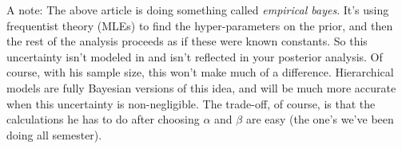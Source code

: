 \documentclass{article}
\begin{document}
A note:  The above article is doing something called {\it empirical bayes}.  It's using frequentist theory (MLEs) to find the hyper-parameters on the prior, and then the rest of the analysis proceeds as if these were known constants.  So this uncertainty isn't modeled in and isn't reflected in your posterior analysis.  Of course, with his sample size, this won't make much of a difference.  Hierarchical models are fully Bayesian versions of this idea, and will be much more accurate when this uncertainty is non-negligible.  The trade-off, of course, is that the calculations he has to do after choosing $\alpha$ and $\beta$ are easy (the one's we've been doing all semester).  


         
\end{document}
